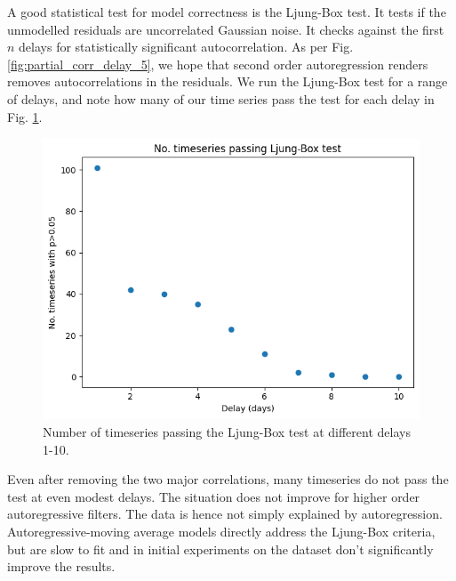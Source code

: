 \documentclass[12pt,a4paper]{article} %
\begin{document}
A good statistical test for model correctness is the Ljung-Box test. It tests if the unmodelled residuals are uncorrelated Gaussian noise. It checks against the first $n$ delays for statistically significant autocorrelation. As per Fig. \ref{fig:partial_corr_delay_5}, we hope that second order autoregression renders removes autocorrelations in the residuals. We run the Ljung-Box test for a range of delays, and note how many of our time series pass the test for each delay in Fig. \ref{fig:lb_test}.
\begin{figure}[!ht]
    \centering
    \includegraphics[width=.7\linewidth]{mean_ljung_box.png}
    \caption{Number of timeseries passing the Ljung-Box test at different delays 1-10.}
    \label{fig:lb_test}
\end{figure}
Even after removing the two major correlations, many timeseries do not pass the test at even modest delays. The situation does not improve for higher order autoregressive filters. The data is hence not simply explained by autoregression. Autoregressive-moving average models directly address the Ljung-Box criteria, but are slow to fit and in initial experiments on the dataset don't significantly improve the results.
\end{document}
